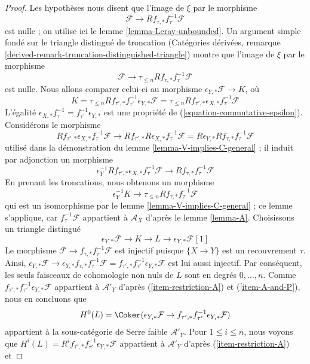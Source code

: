 \begin{proof}
\medskip\noindent
Les hypothèses nous disent que l'image de $\xi$ par le morphisme
$$
\mathcal{F} \longrightarrow Rf_{\tau, *}f_\tau^{-1}\mathcal{F}
$$
est nulle ; on utilise ici le lemme \ref{lemma-Leray-unbounded}.
Un argument simple fondé sur le triangle distingué de troncation
(Catégories dérivées, remarque
\ref{derived-remark-truncation-distinguished-triangle}) montre que
l'image de $\xi$ par le morphisme
$$
\mathcal{F} \longrightarrow \tau_{\leq n}Rf_{\tau, *}f_\tau^{-1}\mathcal{F}
$$
est nulle. Nous allons comparer celui-ci au morphisme
$\epsilon_{Y, *}\mathcal{F} \to K$, où
$$
K = \tau_{\leq n}Rf_{\tau', *}f_{\tau'}^{-1}\epsilon_{Y, *}\mathcal{F} =
\tau_{\leq n}Rf_{\tau', *}\epsilon_{X, *}f_{\tau}^{-1}\mathcal{F}
$$
L'égalité
$\epsilon_{X, *} f_\tau^{-1} = f_{\tau'}^{-1} \epsilon_{Y, *}$
est une propriété de (\ref{equation-commutative-epsilon}). Considérons le
morphisme
$$
Rf_{\tau', *}\epsilon_{X, *}f_{\tau}^{-1}\mathcal{F} \longrightarrow
Rf_{\tau', *}R\epsilon_{X, *}f_{\tau}^{-1}\mathcal{F} =
R\epsilon_{Y, *}Rf_{\tau, *}f_\tau^{-1}\mathcal{F}
$$
utilisé dans la démonstration du lemme \ref{lemma-V-implies-C-general} ;
il induit par adjonction un morphisme
$$
\epsilon_Y^{-1} Rf_{\tau', *}\epsilon_{X, *}f_{\tau}^{-1}\mathcal{F} \to
Rf_{\tau, *}f_\tau^{-1}\mathcal{F}
$$
En prenant les troncations, nous obtenons un morphisme
$$
\epsilon_Y^{-1}K
\longrightarrow
\tau_{\leq n}Rf_{\tau, *}f_\tau^{-1}\mathcal{F}
$$
qui est un isomorphisme par le lemme \ref{lemma-V-implies-C-general} ;
ce lemme s'applique, car $f_\tau^{-1}\mathcal{F}$ appartient à
$\mathcal{A}_X$ d'après le lemme \ref{lemma-A}. Choisissons un triangle
distingué
$$
\epsilon_{Y, *}\mathcal{F} \to K \to L \to \epsilon_{Y, *}\mathcal{F}[1]
$$
Le morphisme $\mathcal{F} \to f_{\tau, *}f_\tau^{-1}\mathcal{F}$
est injectif puisque $\{X \to Y\}$ est un recouvrement $\tau$. Ainsi,
$\epsilon_{Y, *}\mathcal{F} \to
\epsilon_{Y, *}f_{\tau, *}f_\tau^{-1}\mathcal{F} =
f_{\tau', *}f_{\tau'}^{-1}\epsilon_{Y, *}\mathcal{F}$
est lui aussi injectif. Par conséquent, les seuls faisceaux de cohomologie
non nuls de $L$ sont en degrés $0, \ldots, n$.
Comme $f_{\tau', *}f_{\tau'}^{-1}\epsilon_{Y, *}\mathcal{F}$
appartient à $\mathcal{A}'_Y$ d'après (\ref{item-restriction-A}) et
(\ref{item-A-and-P}), nous en concluons que
$$
H^0(L) = \Coker(\epsilon_{Y, *}\mathcal{F} \to
f_{\tau', *}f_{\tau'}^{-1}\epsilon_{Y, *}\mathcal{F})
$$
appartient à la sous-catégorie de Serre faible $\mathcal{A}'_Y$. Pour
$1 \leq i \leq n$, nous voyons que
$H^i(L) = R^if_{\tau', *}f_{\tau'}^{-1}\epsilon_{Y, *}\mathcal{F}$
appartient à $\mathcal{A}'_Y$ d'après (\ref{item-restriction-A}) et

\end{proof}
